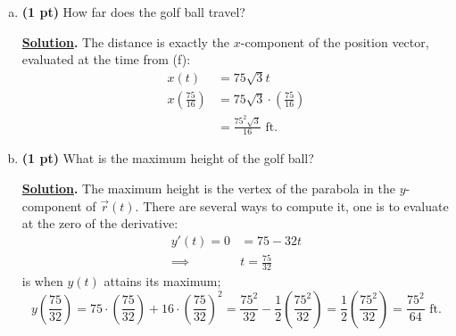 \documentclass[12pt]{article}
\begin{document}
\begin{enumerate}[1.]
\begin{enumerate}[(a)]
	\vspace{1pc}
	\item {\bf (1 pt)} How far does the golf ball travel?
	
	\vspace{0.5pc}
	{\bf\underline{Solution}.} The distance is exactly the $x$-component of the position vector, evaluated at the time from (f):
	\[\begin{split}
	x(t) &= 75\sqrt{3}t \\
	x\left(\textstyle\frac{75}{16}\right) &= 75\sqrt{3}\cdot\left(\textstyle\frac{75}{16}\right) \\
		&\boxed{= \textstyle\frac{75^2\sqrt{3}}{16}\text{ ft.}}
	\end{split}\]
	
	\vspace{1pc}
	\item {\bf (1 pt)} What is the maximum height of the golf ball? 
	
	\vspace{0.5pc}
	{\bf\underline{Solution}.} The maximum height is the vertex of the parabola in the $y$-component of $\overrightarrow{r}(t)$.  There are several ways to compute it, one is to evaluate at the zero of the derivative:
	\[\begin{split}
	y'(t)=0 &= 75-32t \\
	\implies & t=\textstyle\frac{75}{32}
	\end{split}\]
	is when $y(t)$ attains its maximum; 
	\[
	y\left(\textstyle\frac{75}{32}\right) = 75\cdot\left(\textstyle\frac{75}{32}\right) + 16\cdot\left(\textstyle\frac{75}{32}\right)^2 = \textstyle\frac{75^2}{32}-\textstyle\frac{1}{2}\left(\frac{75^2}{32}\right) = \textstyle\frac{1}{2}\left(\frac{75^2}{32}\right) \boxed{= \textstyle\frac{75^2}{64}\text{ ft.}} 
	\]
	
	\end{enumerate}
\end{enumerate}
\end{document}
